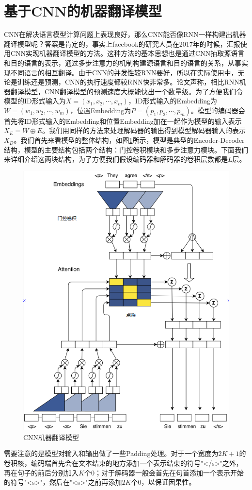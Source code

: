 \documentclass[twoside,a4paper,12pt]{book}%
\begin{document}
\section{基于CNN的机器翻译模型}
\gls{CNN}在解决语言模型计算问题上表现良好，那么\gls{CNN}能否像\gls{RNN}一样构建出机器翻译模型呢？答案是肯定的，事实上facebook的研究人员在2017年的时候，汇报使用\gls{CNN}实现机器翻译模型的方法。这种方法的基本思想也是通过\gls{CNN}抽取源语言和目的语言的表示，通过多步注意力的机制构建源语言和目的语言的关系，从事实现不同语言的相互翻译。由于\gls{CNN}的并发性较\gls{RNN}要好，所以在实际使用中，无论是训练还是预测，\gls{CNN}的执行速度都较\gls{RNN}快非常多。论文声称，相比\gls{RNN}机器翻译模型，\gls{CNN}翻译模型的预测速度大概能快出一个数量级。为了方便我们令模型的ID形式输入为$X=(x_1,x_2,\cdots,x_m)$，ID形式输入的Embedding为$W=(w_1,w_2,\cdots,w_m)$，位置Embedding为$P=(p_1,p_2,\cdots,p_m)$。模型的编码器会首先将ID形式输入的Embedding和位置Embedding加在一起作为模型的输入表示$X_E=W \oplus E$。我们用同样的方法来处理解码器的输出得到模型解码器输入的表示$X_D$。我们首先来看模型的整体结构，如图\ref{fig:cnnnmt}所示，模型是典型的Encoder-Decoder结构，模型的主要结构包括两个结构：门控卷积模块和多步注意力模块。下面我们来详细介绍这两块结构，为了方便我们假设编码器和解码器的卷积层数都是$L$层。
\begin{figure}[h]
	\centering
	\includegraphics[width=0.9\linewidth]{figures/cnn_nmt}
	\caption[CNN机器翻译模型]{CNN机器翻译模型}
	\label{fig:cnnnmt}
\end{figure}
需要注意的是模型对输入和输出做了一些Padding处理。对于一个宽度为$2K+1$的卷积核，编码端首先会在文本结束的地方添加一个表示结束的符号"</s>"之外，再在句子的前后分别加入$K$个0；对于解码器一般会首先在句首添加一个表示开始的符号"<s>"，然后在"<s>"之前再添加$2K$个0，以保证因果性。 
\end{document}

